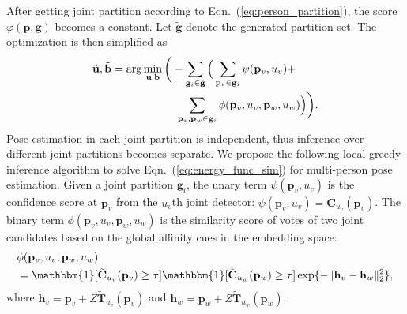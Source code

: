 \documentclass[10pt,twocolumn,letterpaper]{article}
\begin{document}
After getting  joint partition according to Eqn.~(\ref{eq:person_partition}), the score $\varphi(\mathbf{p}, \mathbf{g})$ becomes a constant. Let $\tilde{\mathbf{g}}$  denote the generated partition set. The optimization  is then simplified as %
\begin{equation}\label{eq:energy_func_sim}
\begin{aligned}
\tilde{\mathbf{u}},\tilde{\mathbf{b}}= \mathrm{arg}\min_{\mathbf{u},\mathbf{b}}\bigg(-\sum_{\mathbf{g}_i \in \tilde{\mathbf{g}}}
\Big( & \sum_{\mathbf{p}_v \in \mathbf{g}_i} \psi(\mathbf{p}_v, u_v) + \\
&\hspace{-12mm}\sum_{\mathbf{p}_v,\mathbf{p}_w \in \mathbf{g}_i}\phi(\mathbf{p}_v, u_v, \mathbf{p}_w, u_w)\Big)\bigg).
\end{aligned}
\end{equation}
Pose estimation in each joint partition is independent, thus inference over different joint partitions becomes separate. We propose the following local greedy inference algorithm to solve
Eqn.~(\ref{eq:energy_func_sim})
for multi-person pose estimation. Given a joint partition $\mathbf{g}_i$,   the unary term $\psi(\mathbf{p}_v, u_v)$ is the confidence score   at $\mathbf{p}_v$  from the $u_v$th joint detector: $\psi(\mathbf{p}_v, u_v){=}\tilde{\mathbf{C}}_{u_v}(\mathbf{p}_v)$.
The binary term $\phi(\mathbf{p}_v, u_v, \mathbf{p}_w, u_w)$ is  the similarity score of votes of two joint candidates based on the global affinity cues in the  embedding space:
\begin{equation*}
\begin{aligned}
&\phi(\mathbf{p}_v, u_v, \mathbf{p}_w, u_w) \\
&= \mathbbm{1}[\tilde{\mathbf{C}}_{u_v}(\mathbf{p}_v) \geq \tau]\mathbbm{1}[\tilde{\mathbf{C}}_{u_w}(\mathbf{p}_w) \geq \tau]\exp\{-\|\mathbf{h}_{v}-\mathbf{h}_{w}\|_2^2\},
\end{aligned}
\end{equation*}
where $\mathbf{h}_v{=}\mathbf{p}_v{+}Z\tilde{\mathbf{T}}_{u_v}(\mathbf{p}_v)$ and $\mathbf{h}_w{=}\mathbf{p}_w{+}Z\tilde{\mathbf{T}}_{u_w}(\mathbf{p}_w)$.
\end{document}

